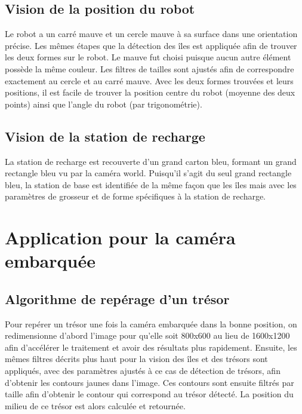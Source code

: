 \subsection{Vision de la position du robot}

Le robot a un carré mauve et un cercle mauve à sa surface dans une orientation précise. Les mêmes étapes que la détection des îles est appliquée afin de trouver les deux formes sur le robot. Le mauve fut choisi puisque aucun autre élément possède la même couleur. Les filtres de tailles sont ajustés afin de correspondre exactement au cercle et au carré mauve. Avec les deux formes trouvées et leurs positions, il est facile de trouver la position centre du robot (moyenne des deux points) ainsi que l'angle du robot (par trigonométrie).


\subsection{Vision de la station de recharge}

La station de recharge est recouverte d'un grand carton bleu, formant un grand rectangle bleu vu par la caméra world. Puisqu'il s'agit du seul grand rectangle bleu, la station de base est identifiée de la même façon que les îles mais avec les paramètres de grosseur et de forme spécifiques à la station de recharge.

\section{Application pour la caméra embarquée}
\subsection{Algorithme de repérage d'un trésor}
Pour repérer un trésor une fois la caméra embarquée dans la bonne position, on redimensionne d'abord l'image pour qu'elle soit 800x600 au lieu de 1600x1200 afin d'accélérer le traitement et avoir des résultats plus rapidement. Ensuite, les mêmes filtres décrits plus haut pour la vision des îles et des trésors sont appliqués, avec des paramètres ajustés à ce cas de détection de trésors, afin d'obtenir les contours jaunes dans l'image. Ces contours sont ensuite filtrés par taille afin d'obtenir le contour qui correspond au trésor détecté. La position du milieu de ce trésor est alors calculée et retournée.
 
